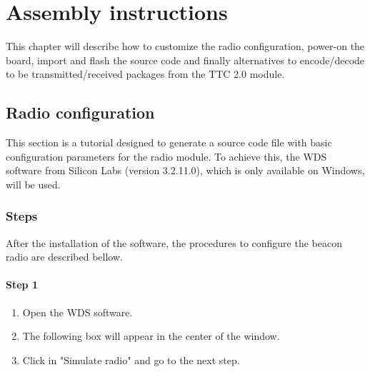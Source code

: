 %
%
%
%
%

%
%
%
%
%

\chapter{Assembly instructions} \label{ch:assembly}

This chapter will describe how to customize the radio configuration, power-on the board, import and flash the source code and finally alternatives to encode/decode to be transmitted/received packages from the TTC 2.0 module.

\section{Radio configuration} \label{sec:wds}

This section is a tutorial designed to generate a source code file with basic configuration parameters for the radio module. To achieve this, the WDS software from Silicon Labs (version 3.2.11.0), which is only available on Windows, will be used.

\subsection{Steps}

After the installation of the software, the procedures to configure the beacon radio are described bellow.

\subsubsection{Step 1}

\begin{enumerate}
    \item Open the WDS software.
    \item The following box will appear in the center of the window.
    \item Click in "Simulate radio" and go to the next step.
\end{enumerate}

